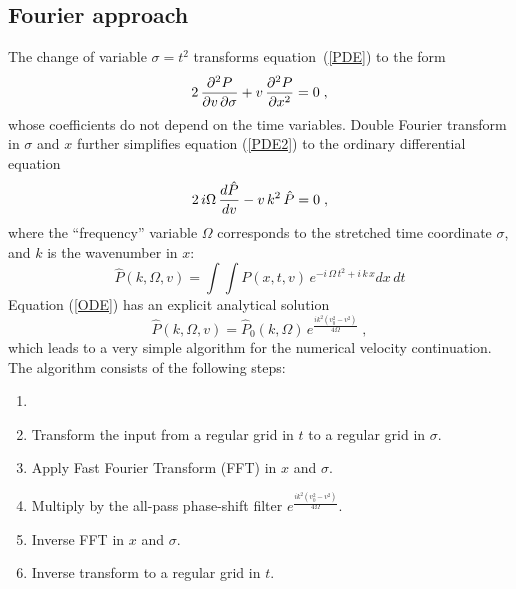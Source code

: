 \par
\subsection{Fourier approach}
\par
The change of variable $\sigma = t^2$ transforms
equation~(\ref{PDE}) to the form
\begin{equation}
  \label{PDE2}
  2\,{{\partial^2 P} \over {\partial v\, \partial \sigma}} +
  v\,{{\partial^2 P} \over {\partial x^2}} = 0\;,
\end{equation}
whose coefficients do not depend on the time variables.  Double Fourier
transform in $\sigma$ and $x$ further simplifies equation (\ref{PDE2})
to the ordinary differential equation
\begin{equation}
  \label{ODE}
  2\,i\Omega\,{{d \hat{P}} \over {d v}} -
  v\,k^2\,\hat{P} = 0\;,
\end{equation}
where the ``frequency'' variable $\Omega$ corresponds to the stretched time
coordinate $\sigma$, and $k$ is the wavenumber in $x$:
\begin{equation}
\label{FFT}
\hat{P}(k,\Omega,v) = \int\!\!\int P(x,t,v)\,
e^{-i\,\Omega\,t^2 + i\,k\,x} d x\,dt
\end{equation}
Equation (\ref{ODE}) has
an explicit analytical solution
\begin{equation}
  \label{ODEsol}
  \hat{P} (k,\Omega,v) = \hat{P}_0 (k,\Omega)\,
  e^{\frac{i k^2(v_0^2-v^2)}{4\Omega}}\;,
\end{equation}
which leads to a very simple algorithm for the numerical velocity
continuation. The algorithm consists of the following steps:
\begin{enumerate}
\item {}
\item Transform the input from a regular grid in $t$ to a regular grid
  in $\sigma$.
\item Apply Fast Fourier Transform (FFT) in $x$ and $\sigma$.
\item Multiply by the all-pass phase-shift filter $e^{\frac{i
      k^2(v_0^2-v^2)}{4\Omega}}$.
\item Inverse FFT in $x$ and $\sigma$.
\item Inverse transform to a regular grid in $t$.
\end{enumerate}



